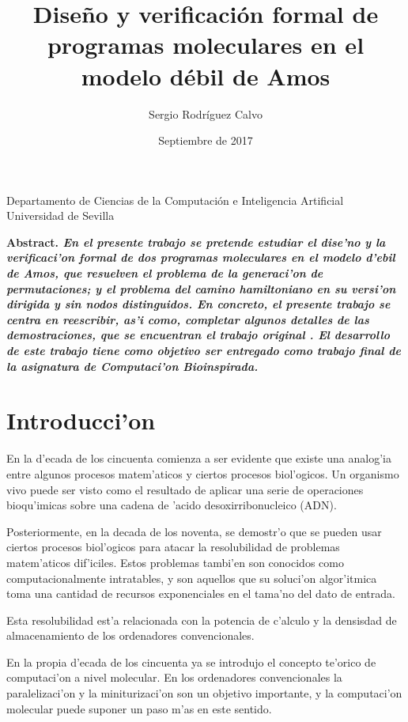 \documentclass[12pt]{article}
\title{Dise\~no y verificaci\'on formal de programas moleculares en el modelo d\'ebil de Amos}
\author{Sergio Rodr\'iguez Calvo}
\date{Septiembre de 2017}
\begin{document}
    \maketitle
    \thispagestyle{empty}
    \begin{center}
      Departamento de Ciencias de la Computaci\'on e
      Inteligencia Artificial \\
      Universidad de Sevilla
      \end{center}
  \bf{Abstract. }\rm
    \emph{En el presente trabajo se pretende estudiar el dise'no y la verificaci'on formal
    de dos programas moleculares en el modelo d'ebil de Amos, que resuelven el problema de la generaci'on
    de permutaciones; y el problema del camino hamiltoniano en su versi'on dirigida y sin
    nodos distinguidos. En concreto, el presente trabajo se centra en reescribir, as'i como, completar algunos detalles
    de las demostraciones, que se encuentran el trabajo original \cite{Mario-deJesus}.
    El desarrollo de este trabajo tiene como objetivo ser entregado como trabajo final de la asignatura de
    Computaci'on Bioinspirada.}

\section{Introducci'on}

En la d'ecada de los cincuenta comienza a ser evidente que existe una analog'ia entre algunos procesos
matem'aticos y ciertos procesos biol'ogicos. Un organismo vivo puede ser visto como el resultado de
aplicar una serie de operaciones bioqu'imicas sobre una cadena de 'acido desoxirribonucleico (ADN).

Posteriormente, en la decada de los noventa, se demostr'o que se pueden usar ciertos procesos biol'ogicos
para atacar la resolubilidad de problemas matem'aticos dif'iciles. Estos problemas tambi'en son conocidos
como computacionalmente intratables, y son aquellos que su soluci'on algor'itmica toma una cantidad de
recursos exponenciales en el tama'no del dato de entrada.

Esta resolubilidad est'a relacionada con la potencia de c'alculo y la densisdad de almacenamiento de los
ordenadores convencionales.

En la propia d'ecada de los cincuenta ya se introdujo el concepto te'orico de computaci'on a nivel molecular.
En los ordenadores convencionales la paralelizaci'on y la miniturizaci'on son un objetivo importante, y la
computaci'on molecular puede suponer un paso m'as en este sentido.
\end{document}
